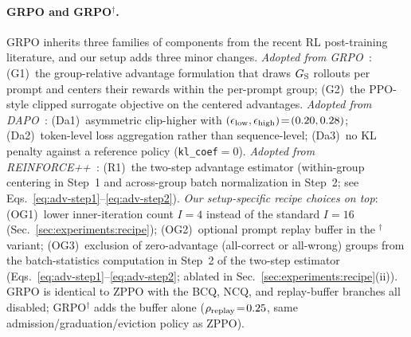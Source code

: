 \paragraph{GRPO and GRPO$^{\dagger}$.}
GRPO inherits three families of components from the recent RL post-training literature, and our setup adds three minor changes. \emph{Adopted from GRPO~\citep{shao2024deepseekmath}}: (G1)~the group-relative advantage formulation that draws $G_{\rm S}$ rollouts per prompt and centers their rewards within the per-prompt group; (G2)~the PPO-style clipped surrogate objective on the centered advantages. \emph{Adopted from DAPO~\citep{yu2025dapo}}: (Da1)~asymmetric clip-higher with $(\epsilon_{\rm low},\epsilon_{\rm high})\!=\!(0.20, 0.28)$; (Da2)~token-level loss aggregation rather than sequence-level; (Da3)~no KL penalty against a reference policy (\texttt{kl\_coef}$=\!0$). \emph{Adopted from REINFORCE++~\citep{hu2025reinforce++}}: (R1)~the two-step advantage estimator (within-group centering in Step~1 and across-group batch normalization in Step~2; see Eqs.~\ref{eq:adv-step1}--\ref{eq:adv-step2}). \emph{Our setup-specific recipe choices on top}: (OG1)~lower inner-iteration count $I\!=\!4$ instead of the standard $I\!=\!16$ (Sec.~\ref{sec:experiments:recipe}); (OG2)~optional prompt replay buffer in the $^{\dagger}$ variant; (OG3)~exclusion of zero-advantage (all-correct or all-wrong) groups from the batch-statistics computation in Step~2 of the two-step estimator (Eqs.~\ref{eq:adv-step1}--\ref{eq:adv-step2}; ablated in Sec.~\ref{sec:experiments:recipe}(ii)). GRPO is identical to ZPPO with the BCQ, NCQ, and replay-buffer branches all disabled; GRPO$^{\dagger}$ adds the buffer alone ($\rho_{\rm replay}\!=\!0.25$, same admission/graduation/eviction policy as ZPPO).
